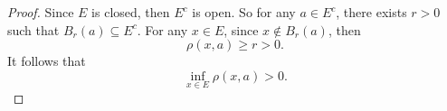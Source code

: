 \begin{Exercise}
\begin{proof}
Since $E$ is closed, then $E^c$ is open. So for any $a\in E^c$, there exists $r>0$ such that $B_r(a) \subseteq E^c$. For any $x\in E$, since $x\notin B_r(a)$, then
$$
\rho(x,a) \geq r > 0.
$$
It follows that
$$
\inf_{x\in E}\rho(x,a) > 0.
$$
\end{proof}
\end{Exercise}